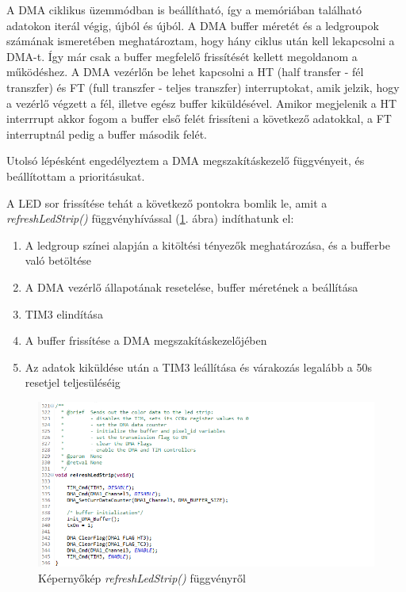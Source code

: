 \documentclass[../main.tex]{subfiles}
\begin{document}
             A DMA ciklikus üzemmódban is beállítható, így a memóriában található adatokon iterál végig, újból és újból. A DMA buffer méretét és a ledgroupok számának ismeretében meghatároztam, hogy hány ciklus után kell lekapcsolni a DMA-t. Így már csak a buffer megfelelő frissítését kellett megoldanom a működéshez. A DMA vezérlőn be lehet kapcsolni a HT (half transfer - fél transzfer) és FT (full transzfer - teljes transzfer) interruptokat, amik jelzik, hogy a vezérlő végzett a fél, illetve egész buffer kiküldésével. Amikor megjelenik a HT interrrupt akkor fogom a buffer első felét frissíteni a következő adatokkal, a FT interruptnál pedig a buffer második felét.
             
             Utolsó lépésként engedélyeztem a DMA megszakításkezelő függvényeit, és beállítottam a prioritásukat.
             
             A LED sor frissítése tehát a következő pontokra bomlik le, amit a \textit{refreshLedStrip()} függvényhívással (\ref{fig:ws2811_refreshledstrip}. ábra) indíthatunk el:
            \begin{enumerate}
                \item A ledgroup színei alapján a kitöltési tényezők meghatározása, és a bufferbe való betöltése
                \item A DMA vezérlő állapotának resetelése, buffer méretének a beállítása
                \item TIM3 elindítása
                \item A buffer frissítése a DMA megszakításkezelőjében
                \item Az adatok kiküldése után a TIM3 leállítása és várakozás legalább a 50\micro s resetjel teljesüléséig
            \end{enumerate}
            
            \begin{figure}[h!]
                \centering
                    \includegraphics[width=14cm]{mbed_res/ws2811_refreshLedStrip}
                \caption{Képernyőkép \textit{refreshLedStrip()} függvényről}
                \label{fig:ws2811_refreshledstrip}
            \end{figure}
            
\end{document}
